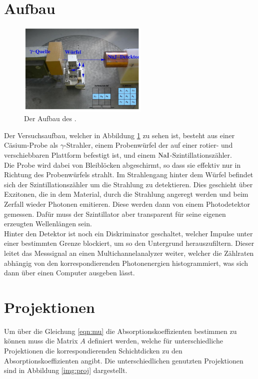 \newpage
\section{Aufbau}

\begin{figure}[H]
    \centering
    \includegraphics[width=0.55\textwidth]{latex/images/aufbau.PNG}
    \caption{Der Aufbau des \protect \cite{V14}.}
    \label{img:aufb}
\end{figure}

Der Versuchsaufbau, welcher in Abbildung \ref{img:aufb} zu sehen ist, besteht aus einer Cäsium-Probe als $\gamma$-Strahler, 
einem Probenwürfel der auf einer rotier- und verschiebbaren Plattform befestigt ist, und einem $\ce{NaI}$-Szintillationszähler.\\
Die Probe wird dabei von Bleiblöcken abgeschirmt, so dass sie effektiv nur in Richtung des Probenwürfels strahlt. 
Im Strahlengang hinter dem Würfel befindet sich der Szintillationszähler um die Strahlung zu detektieren. 
Dies geschieht über Exzitonen, die in dem Material, durch die Strahlung angeregt werden und beim Zerfall wieder Photonen emitieren. 
Diese werden dann von einem Photodetektor gemessen. Dafür muss der Szintillator aber transparent für seine eigenen erzeugten Wellenlängen sein.\\
Hinter den Detektor ist noch ein Diskriminator geschaltet, welcher Impulse unter einer bestimmten Grenze blockiert, um so den Untergrund herauszufiltern.
Dieser leitet das Messsignal an einen Multichannelanalyzer weiter, welcher die Zählraten abhängig von den korrespondierenden Photonenergien histogrammiert, 
was sich dann über einen Computer ausgeben lässt.

\section{Projektionen}
\label{sec:proj}

\noindent
Um über die Gleichung \ref{eqn:mu} die Absorptionskoeffizienten bestimmen zu können muss die Matrix $A$ definiert werden, 
welche für unterschiedliche  Projektionen die korrespondierenden Schichtdicken zu den Absorptionskoeffizienten angibt. 
Die unterschiedlichen genutzten Projektionen sind in Abbildung \ref{img:proj} dargestellt.

